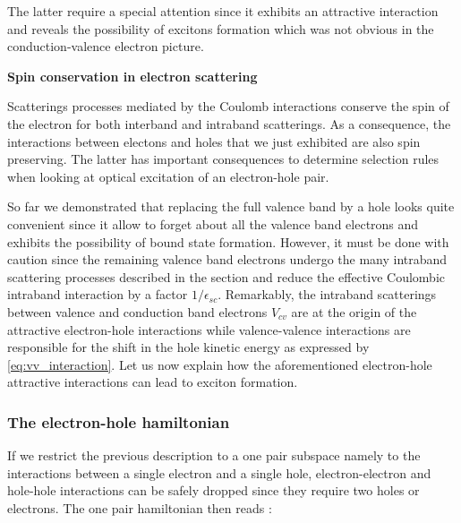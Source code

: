 The latter require a special attention since it exhibits an attractive interaction and reveals the possibility of excitons formation which was not obvious in the conduction-valence electron picture.
\bigskip

\noindent \large \textbf{Spin conservation in electron scattering } \normalsize
\bigskip


Scatterings processes mediated by the Coulomb interactions conserve the spin of the electron for both interband and intraband scatterings. As a consequence,
the interactions between electons and holes that we just exhibited are also spin preserving. The latter has important consequences to determine
selection rules when looking at optical excitation of an electron-hole pair. 

\bigskip

\indent So far we demonstrated that replacing the full valence band by a hole looks quite convenient since it allow to forget about all the valence band electrons and exhibits the possibility of bound state formation. However, it must be done with caution
since the remaining valence band electrons undergo the many intraband scattering processes described in the section and reduce the effective Coulombic intraband interaction by 
a factor $1/\epsilon_{sc}$. Remarkably, the intraband scatterings between valence and conduction band electrons $V_{cv}$ are at the origin of the attractive electron-hole interactions while valence-valence interactions are responsible for the shift in the hole kinetic energy as expressed by \autoref{eq:vv_interaction}.
Let us now explain how the aforementioned electron-hole attractive interactions can lead to exciton formation.

\subsubsection{The electron-hole hamiltonian}
\label{e-h_hamiltonian}

If we restrict the previous description to a one pair subspace namely to the interactions between a single electron and a single hole, electron-electron and hole-hole
interactions can be safely dropped since they require two holes or electrons. The one pair hamiltonian then reads : 


